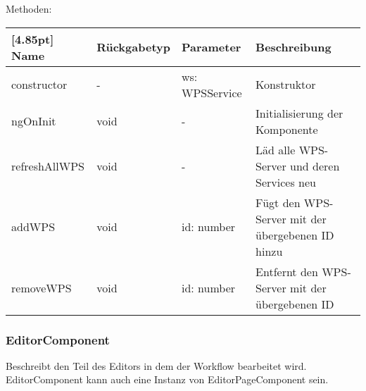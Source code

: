 				Methoden:
				\begin{center}
				\setlength\tabcolsep{5pt}
					\renewcommand{\arraystretch}{1.5}
						\begin{tabularx}{\textwidth}{|l|l|l|X|}
						\hline
						\rowcolor[gray]{0.75}[4.85pt]
						Name & Rückgabetyp & Parameter & Beschreibung \\ \hline 
						constructor & - & ws: WPSService & Konstruktor \\ \hline
						ngOnInit & void & - & Initialisierung der Komponente \\ \hline
						refreshAllWPS & void & - & Läd alle WPS-Server und deren Services neu \\ \hline
						addWPS & void & id: number & Fügt den WPS-Server mit der übergebenen ID hinzu \\ \hline
						removeWPS & void & id: number & Entfernt den WPS-Server mit der übergebenen ID \\ \hline
						\end{tabularx}
				\end{center}
			
			\subsubsection{EditorComponent}
			
			Beschreibt den Teil des Editors in dem der Workflow bearbeitet wird. EditorComponent kann auch eine Instanz von EditorPageComponent sein.\newline
			
